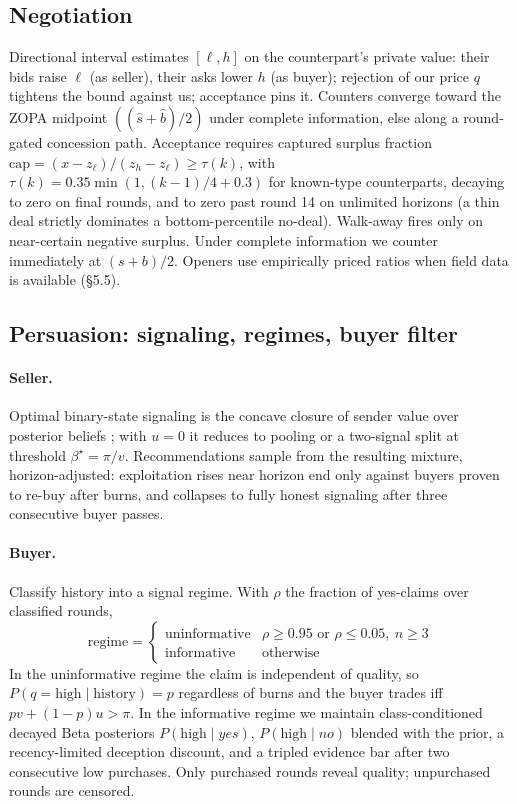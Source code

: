 \documentclass[11pt]{article}
\begin{document}
\subsection{Negotiation}
Directional interval estimates $[\ell,h]$ on the counterpart's private value: their bids raise $\ell$ (as seller), their asks lower $h$ (as buyer); rejection of our price $q$ tightens the bound against us; acceptance pins it. Counters converge toward the ZOPA midpoint $((\hat s + \hat b)/2)$ under complete information, else along a round-gated concession path. Acceptance requires captured surplus fraction
$\mathrm{cap} = (x - z_\ell)/(z_h - z_\ell) \ge \tau(k)$,
with $\tau(k)=0.35\min(1,(k{-}1)/4+0.3)$ for known-type counterparts, decaying to zero on final rounds, and to zero past round 14 on unlimited horizons (a thin deal strictly dominates a bottom-percentile no-deal). Walk-away fires only on near-certain negative surplus. Under complete information we counter immediately at $(s+b)/2$. Openers use empirically priced ratios when field data is available (\S5.5).

\subsection{Persuasion: signaling, regimes, buyer filter}
\paragraph{Seller.} Optimal binary-state signaling is the concave closure of sender value over posterior beliefs \citep{kamenica2011bayesian}; with $u{=}0$ it reduces to pooling or a two-signal split at threshold $\beta^\star = \pi/v$. Recommendations sample from the resulting mixture, horizon-adjusted: exploitation rises near horizon end only against buyers proven to re-buy after burns, and collapses to fully honest signaling after three consecutive buyer passes.

\paragraph{Buyer.} Classify history into a signal regime. With $\rho$ the fraction of yes-claims over classified rounds,
\[
\mathrm{regime} =
\begin{cases}
\text{uninformative} & \rho \ge 0.95 \text{ or } \rho \le 0.05,\ n \ge 3\\
\text{informative} & \text{otherwise}
\end{cases}
\]
In the uninformative regime the claim is independent of quality, so $P(q{=}\mathrm{high}\mid \mathrm{history}) = p$ regardless of burns and the buyer trades iff $pv + (1-p)u > \pi$. In the informative regime we maintain class-conditioned decayed Beta posteriors $P(\mathrm{high}\mid yes)$, $P(\mathrm{high}\mid no)$ blended with the prior, a recency-limited deception discount, and a tripled evidence bar after two consecutive low purchases. Only purchased rounds reveal quality; unpurchased rounds are censored.
\end{document}
